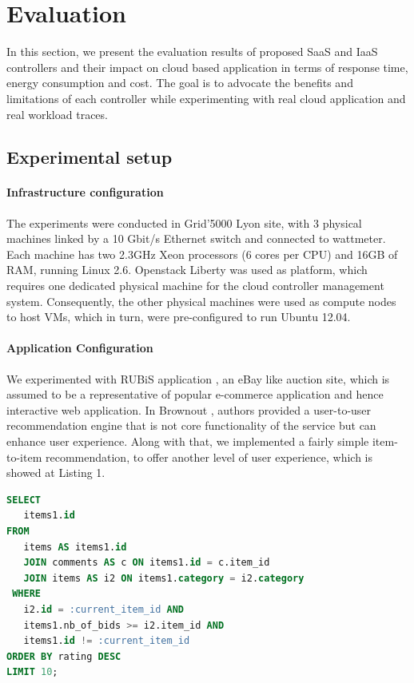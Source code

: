 \section{Evaluation}
In this section, we present the evaluation results of proposed SaaS and IaaS controllers and their impact on cloud based application
in terms of response time, energy consumption and cost. The goal is to advocate the benefits
and limitations of each controller while experimenting
with real cloud application and real workload traces.

\subsection{Experimental setup}
\paragraph*{\textbf{Infrastructure configuration}}The experiments were conducted in Grid'5000 Lyon site,
with 3 physical machines linked by a 10 Gbit/s Ethernet
switch and connected to wattmeter. Each machine has two
2.3GHz Xeon processors (6 cores per CPU) and 16GB of
RAM, running Linux 2.6. Openstack Liberty was used
as platform, which requires one dedicated physical machine
for the cloud controller management system. Consequently,
the other physical machines were used as compute nodes to
host VMs, which in turn, were pre-configured to run Ubuntu
12.04.

\paragraph*{\textbf{Application Configuration}} We experimented with
RUBiS application \cite{rubis}, an eBay like auction site, which
is assumed to be a representative of popular e-commerce application 
and hence interactive web application. In Brownout \cite{brownout}, authors provided a user-to-user recommendation engine that is not core functionality of the service but can enhance user experience. Along with that, we implemented a fairly simple item-to-item recommendation, to offer another level of user experience, which is showed at Listing 1. 

\begin{lstlisting}[language=SQL,caption={SQL statement for the recommender system.}, label={sql}]
SELECT
   items1.id
FROM
   items AS items1.id
   JOIN comments AS c ON items1.id = c.item_id
   JOIN items AS i2 ON items1.category = i2.category
 WHERE 
   i2.id = :current_item_id AND
   items1.nb_of_bids >= i2.item_id AND
   items1.id != :current_item_id
ORDER BY rating DESC
LIMIT 10;   
\end{lstlisting}



